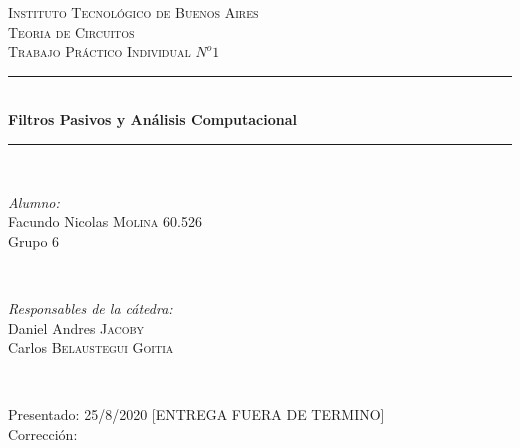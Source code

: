\begin{titlepage}
\newcommand{\HRule}{\rule{\linewidth}{0.5mm}}
\center
\textsc{\LARGE Instituto Tecnológico de Buenos Aires}\\[1.5cm]
\textsc{\Large Teoria de Circuitos}\\[0.5cm]
\textsc{\large Trabajo Práctico Individual $N^o1$}\\[0.5cm]

\HRule \\[0.4cm]
{ \huge \bfseries Filtros Pasivos y Análisis Computacional}\\[0.1cm] %
\HRule \\[1.5cm]

\begin{minipage}{0.4\textwidth}
\begin{flushleft} \large
\emph{Alumno:}\\
Facundo Nicolas \textsc{Molina} 60.526\\
Grupo 6\\
\end{flushleft}
\end{minipage}
~
\begin{minipage}{0.4\textwidth}
\begin{flushright} \large
\emph{Responsables de la cátedra:} \\
Daniel Andres \textsc{Jacoby}\\
Carlos \textsc{Belaustegui Goitia}\\

\end{flushright}
\end{minipage}\\[4cm]

\begin{minipage}{0.7\textwidth}
\begin{flushleft} \large
Presentado: 25/8/2020 [ENTREGA FUERA DE TERMINO]\\
Corrección: \\
\end{flushleft}
\end{minipage}
\vfill %

\end{titlepage}
